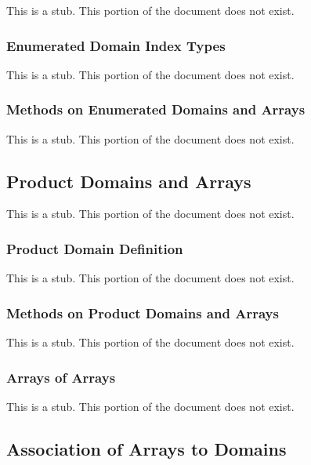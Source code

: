 This is a stub.  This portion of the document does not exist.

\subsubsection{Enumerated Domain Index Types}
\label{Enumerated_Domain_Index_Types}

This is a stub.  This portion of the document does not exist.

\subsubsection{Methods on Enumerated Domains and Arrays}
\label{Methods_on_Enumerated_Domains_and_Arrays}

This is a stub.  This portion of the document does not exist.

\subsection{Product Domains and Arrays}
\label{Product_Domains_and_Arrays}

This is a stub.  This portion of the document does not exist.

\subsubsection{Product Domain Definition}
\label{Product_Domain_Definition}

This is a stub.  This portion of the document does not exist.

\subsubsection{Methods on Product Domains and Arrays}
\label{Methods_on_Product_Domains_and_Arrays}

This is a stub.  This portion of the document does not exist.

\subsubsection{Arrays of Arrays}
\label{Arrays_of_Arrays}

This is a stub.  This portion of the document does not exist.

\subsection{Association of Arrays to Domains}
\label{Association_of_Arrays_to_Domains}

